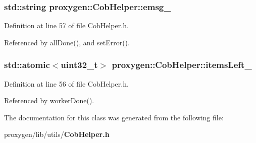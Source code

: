 \subsubsection[{emsg\+\_\+}]{\setlength{\rightskip}{0pt plus 5cm}std\+::string proxygen\+::\+Cob\+Helper\+::emsg\+\_\+\hspace{0.3cm}{\ttfamily [private]}}\label{classproxygen_1_1CobHelper_acf9111dee0bc8cbc4fe227db988e650a}


Definition at line 57 of file Cob\+Helper.\+h.



Referenced by all\+Done(), and set\+Error().

\subsubsection[{items\+Left\+\_\+}]{\setlength{\rightskip}{0pt plus 5cm}std\+::atomic$<$uint32\+\_\+t$>$ proxygen\+::\+Cob\+Helper\+::items\+Left\+\_\+\hspace{0.3cm}{\ttfamily [private]}}\label{classproxygen_1_1CobHelper_a029769e43745539b0d863ccd0b45e440}


Definition at line 56 of file Cob\+Helper.\+h.



Referenced by worker\+Done().



The documentation for this class was generated from the following file\+:\begin{DoxyCompactItemize}
\item 
proxygen/lib/utils/{\bf Cob\+Helper.\+h}\end{DoxyCompactItemize}
